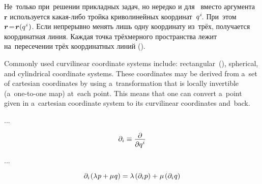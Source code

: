 \begin{otherlanguage}{russian}

Не~только при~решении прикладных задач, но нередко и для~ вместо аргумента~$\bm{r}$ ис\-поль\-зу\-ет\-ся какая-либо трой\-ка криво\-линей\-ных координат~${q^{\hspace{.1ex}i}\hspace{-0.2ex}}$. При~этом ${\bm{r} \!=\! \bm{r}(q^{\hspace{.1ex}i}\hspace{.1ex})}$. Если непрерывно менять лишь одну координату из~трёх, получается координатная линия. Каждая точка трёхмерного пространства лежит на~пересечении трёх координатных линий ().

Commonly used curvilinear coordinate systems include: rectangular~(), spherical, and cylindrical coordinate systems. These coordinates may be derived from a~set of cartesian coordinates by using a~transformation that is locally invertible (a~one-to-one map) at~each point. This means that one can convert a~point given in a~cartesian coordinate system to its curvilinear coordinates and~back.

...

\nopagebreak\vspace{-0.1em}\begin{equation*}
\partial_i \equiv \frac{\raisebox{-0.2em}{$\partial$}}{\raisebox{-0.1em}{$\partial q^i$}}
\end{equation*}

...


\nopagebreak\vspace{-0.4em}\begin{equation}\label{linearityordifferentiation}
\partial_i \hspace{-0.2ex} \left( \lambda \hspace{.1ex} p + \hspace{-0.1ex} \mu \hspace{.1ex} q \right)
= \lambda \hspace{-0.1ex} \left( \partial_i \hspace{.1ex} p \right) + \hspace{.1ex}
\mu \hspace{-0.1ex} \left( \partial_i \hspace{.1ex} q \right)
\end{equation}



\end{otherlanguage}
